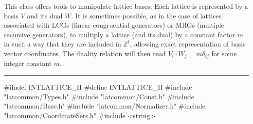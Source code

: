 % 
% 
% 
% 


This class offers tools to manipulate lattice bases.
Each lattice is represented by a basis $V$ and its dual $W$.
It is sometimes possible, as in the case of lattices associated with
LCGs (linear congruential generators) or MRGs (multiple recursive generators),
 to multiply a lattice (and its dual) by a constant factor $m$
in such a way that they are included in $\mathbb{Z}^t$, allowing
exact representation of basis vector coordinates.
The duality relation will then read $V_i\cdot W_j = m\delta_{ij}$
for some integer constant {$m$}.

\bigskip
\hrule
\code\hide
#ifndef INTLATTICE_H
#define INTLATTICE_H
\endhide
#include "latcommon/Types.h"
#include "latcommon/Const.h"
#include "latcommon/Base.h"
#include "latcommon/Normalizer.h"
#include "latcommon/CoordinateSets.h"
#include <string>


